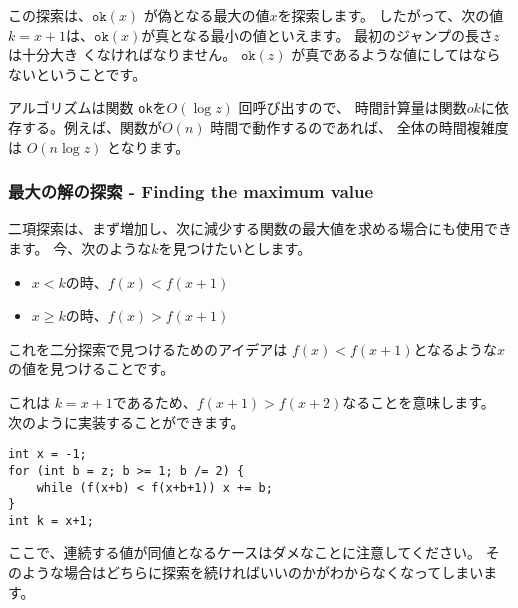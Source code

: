 この探索は、$\texttt{ok}(x)$ が偽となる最大の値$x$を探索します。
したがって、次の値$k=x+1$は、$\texttt{ok}(x)$が真となる最小の値といえます。
最初のジャンプの長さ$z$は十分大き くなければなりません。
$\texttt{ok}(z)$ が真であるような値にしてはならないということです。

アルゴリズムは関数 \texttt{ok}を$O(\log z)$ 回呼び出すので、
時間計算量は関数$ok$に依存する。例えば、関数が$ O(n)$ 時間で動作するのであれば、
全体の時間複雑度は $O(n \log z)$ となります。


\subsubsection{最大の解の探索 - Finding the maximum value}


二項探索は、まず増加し、次に減少する関数の最大値を求める場合にも使用できます。
今、次のような$k$を見つけたいとします。

\begin{itemize}
\item
$x<k$の時、$f(x)<f(x+1)$
\item
$x \ge k$の時、$f(x)>f(x+1)$
\end{itemize}

これを二分探索で見つけるためのアイデアは $f(x)<f(x+1)$となるような$x$の値を見つけることです。

これは $k=x+1$であるため、$f(x+1)>f(x+2)$なることを意味します。
次のように実装することができます。

\begin{lstlisting}
int x = -1;
for (int b = z; b >= 1; b /= 2) {
    while (f(x+b) < f(x+b+1)) x += b;
}
int k = x+1;
\end{lstlisting}

ここで、連続する値が同値となるケースはダメなことに注意してください。
そのような場合はどちらに探索を続ければいいのかがわからなくなってしまいます。
